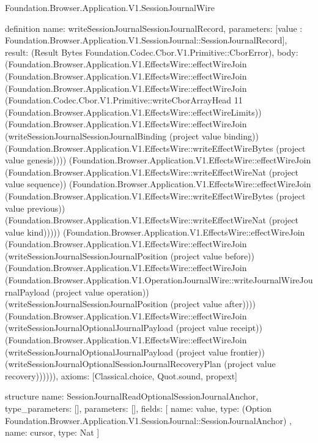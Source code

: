 \begin{lexlean}{Foundation.Browser.Application.V1.SessionJournalWire}
\begin{semanticmodule}
definition{
  name: writeSessionJournalSessionJournalRecord,
  parameters: [value : Foundation.Browser.Application.V1.SessionJournal::SessionJournalRecord],
  result: (Result Bytes Foundation.Codec.Cbor.V1.Primitive::CborError),
  body: (Foundation.Browser.Application.V1.EffectsWire::effectWireJoin (Foundation.Browser.Application.V1.EffectsWire::effectWireJoin (Foundation.Browser.Application.V1.EffectsWire::effectWireJoin (Foundation.Codec.Cbor.V1.Primitive::writeCborArrayHead 11 (Foundation.Browser.Application.V1.EffectsWire::effectWireLimits)) (Foundation.Browser.Application.V1.EffectsWire::effectWireJoin (writeSessionJournalSessionJournalBinding (project value binding)) (Foundation.Browser.Application.V1.EffectsWire::writeEffectWireBytes (project value genesis)))) (Foundation.Browser.Application.V1.EffectsWire::effectWireJoin (Foundation.Browser.Application.V1.EffectsWire::writeEffectWireNat (project value sequence)) (Foundation.Browser.Application.V1.EffectsWire::effectWireJoin (Foundation.Browser.Application.V1.EffectsWire::writeEffectWireBytes (project value previous)) (Foundation.Browser.Application.V1.EffectsWire::writeEffectWireNat (project value kind))))) (Foundation.Browser.Application.V1.EffectsWire::effectWireJoin (Foundation.Browser.Application.V1.EffectsWire::effectWireJoin (writeSessionJournalSessionJournalPosition (project value before)) (Foundation.Browser.Application.V1.EffectsWire::effectWireJoin (Foundation.Browser.Application.V1.OperationJournalWire::writeJournalWireJournalPayload (project value operation)) (writeSessionJournalSessionJournalPosition (project value after)))) (Foundation.Browser.Application.V1.EffectsWire::effectWireJoin (writeSessionJournalOptionalJournalPayload (project value receipt)) (Foundation.Browser.Application.V1.EffectsWire::effectWireJoin (writeSessionJournalOptionalJournalPayload (project value frontier)) (writeSessionJournalOptionalSessionJournalRecoveryPlan (project value recovery)))))),
  axioms: [Classical.choice, Quot.sound, propext]
}

structure{
  name: SessionJournalReadOptionalSessionJournalAnchor,
  type_parameters: [],
  parameters: [],
  fields: [
    {
      name: value,
      type: (Option Foundation.Browser.Application.V1.SessionJournal::SessionJournalAnchor)
    },
    {name: cursor, type: Nat}
  ]
}


\end{semanticmodule}
\end{lexlean}
